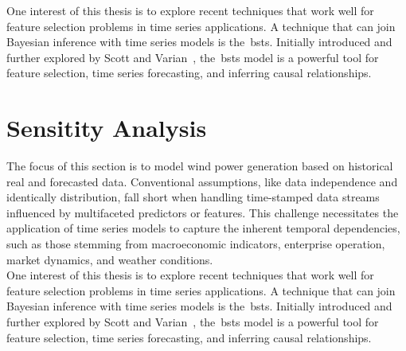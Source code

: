     One interest of this thesis is to explore recent techniques that work well for feature selection problems in
    time series applications.
    A technique that can join Bayesian inference with time series models is the~\gls{bsts}.
    Initially introduced and further explored by Scott and Varian~\cite{scott_predicting_2013, scott_bayesian_2013},
    the~\gls{bsts} model is a powerful tool for feature selection,
time series forecasting, and inferring causal relationships. \\


\section{Sensitity Analysis}
    \label{sec:sens_analysis}

    The focus of this section is to model wind power generation based on historical real and forecasted data.
    Conventional assumptions, like data independence and identically distribution, fall short when handling time-stamped
    data streams influenced by multifaceted predictors or features.
    This challenge necessitates the application of time series models to capture the inherent temporal dependencies,
    such as those stemming from macroeconomic indicators, enterprise operation, market dynamics, and weather conditions.\\

    One interest of this thesis is to explore recent techniques that work well for feature selection problems in
    time series applications.
    A technique that can join Bayesian inference with time series models is the~\gls{bsts}.
    Initially introduced and further explored by Scott and Varian~\cite{scott_predicting_2013, scott_bayesian_2013},
    the~\gls{bsts} model is a powerful tool for feature selection,
time series forecasting, and inferring causal relationships. \\



